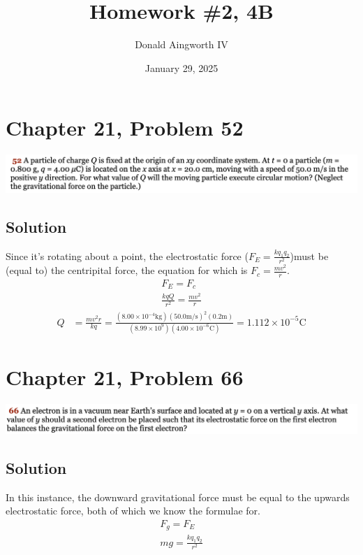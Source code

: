 \documentclass[12pt]{article}
\title{Homework \#2, 4B}
\author{Donald Aingworth IV}
\date{January 29, 2025}
\begin{document}

\maketitle

\pagebreak
\section*{Chapter 21, Problem 52}
\includegraphics[width=\textwidth]{picture_1.png}

\subsection*{Solution}
Since it's rotating about a point, the electrostatic force ($F_E = \frac{kq_1 q_2}{r^2}$)must be (equal to) the centripital force, the equation for which is $F_c = \frac{mv^2}{r}$. 
\begin{gather*}
    F_E = F_c\\
    \frac{kqQ}{r^2} = \frac{mv^2}{r}
\end{gather*}
\begin{align*}
    Q   &=  \frac{mv^2r}{kq}
        =   \frac{(8.00 \times 10^{-4} \unit{\kilo\gram})(50.0\unit{\meter/\second})^2(0.2\unit{\meter})}{(8.99 \times 10^{9})(4.00 \times 10^{-6} \unit{\coulomb})}
        =   \boxed{1.112 \times 10^{-5} \unit{\coulomb}}
\end{align*}

\pagebreak
\section*{Chapter 21, Problem 66}
\includegraphics[width=\textwidth]{picture_2.png}

\subsection*{Solution}
In this instance, the downward gravitational force must be equal to the upwards electrostatic force, both of which we know the formulae for.
\begin{gather*}
    F_g = F_E\\
    mg = \frac{kq_1 q_2}{r^2}
\end{gather*}
\end{document}
